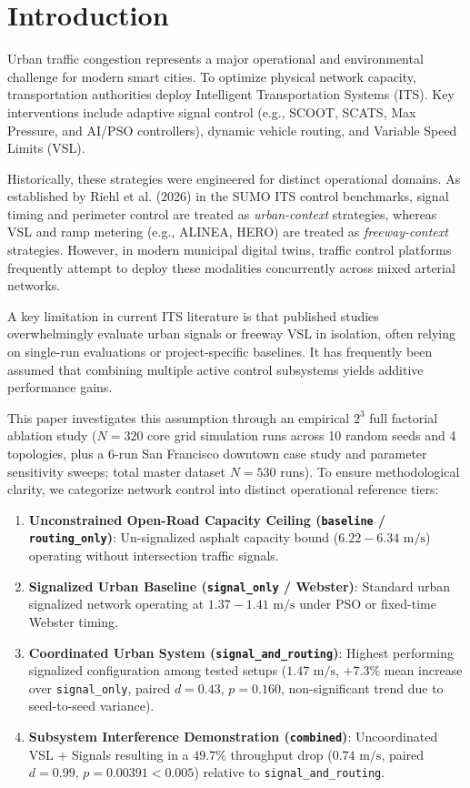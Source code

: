 \documentclass[3p,times,procedia]{elsarticle}
\begin{document}
\section{Introduction}
\label{sec:intro}

Urban traffic congestion represents a major operational and environmental challenge for modern smart cities. To optimize physical network capacity, transportation authorities deploy Intelligent Transportation Systems (ITS). Key interventions include adaptive signal control (e.g., SCOOT, SCATS, Max Pressure, and AI/PSO controllers), dynamic vehicle routing, and Variable Speed Limits (VSL).

Historically, these strategies were engineered for distinct operational domains. As established by Riehl et al. (2026) in the SUMO ITS control benchmarks, signal timing and perimeter control are treated as \emph{urban-context} strategies, whereas VSL and ramp metering (e.g., ALINEA, HERO) are treated as \emph{freeway-context} strategies. However, in modern municipal digital twins, traffic control platforms frequently attempt to deploy these modalities concurrently across mixed arterial networks.

A key limitation in current ITS literature is that published studies overwhelmingly evaluate urban signals or freeway VSL in isolation, often relying on single-run evaluations or project-specific baselines. It has frequently been assumed that combining multiple active control subsystems yields additive performance gains.

This paper investigates this assumption through an empirical $2^3$ full factorial ablation study ($N=320$ core grid simulation runs across 10 random seeds and 4 topologies, plus a 6-run San Francisco downtown case study and parameter sensitivity sweeps; total master dataset $N=530$ runs). To ensure methodological clarity, we categorize network control into distinct operational reference tiers:
\begin{enumerate}
    \item \textbf{Unconstrained Open-Road Capacity Ceiling (\texttt{baseline} / \texttt{routing\_only})}: Un-signalized asphalt capacity bound ($6.22 - 6.34\text{ m/s}$) operating without intersection traffic signals.
    \item \textbf{Signalized Urban Baseline (\texttt{signal\_only} / Webster)}: Standard urban signalized network operating at $1.37 - 1.41\text{ m/s}$ under PSO or fixed-time Webster timing.
    \item \textbf{Coordinated Urban System (\texttt{signal\_and\_routing})}: Highest performing signalized configuration among tested setups ($1.47\text{ m/s}$, $+7.3\%$ mean increase over \texttt{signal\_only}, paired $d = 0.43$, $p = 0.160$, non-significant trend due to seed-to-seed variance).
    \item \textbf{Subsystem Interference Demonstration (\texttt{combined})}: Uncoordinated VSL + Signals resulting in a $49.7\%$ throughput drop ($0.74\text{ m/s}$, paired $d = 0.99$, $p = 0.00391 < 0.005$) relative to \texttt{signal\_and\_routing}.
\end{enumerate}
\end{document}
